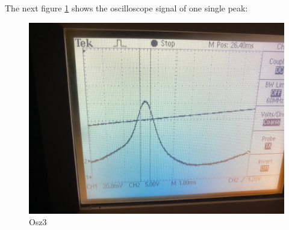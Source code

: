 \documentclass{article}
\begin{document}

The next figure \ref{Osz3} shows the oscilloscope signal of one single peak:
\begin{figure}[h!]
\includegraphics[width=\textwidth]{oszilloskopbild 3.jpg}
\caption{Osz3}
\label{Osz3}
\end{figure}
\end{document}
